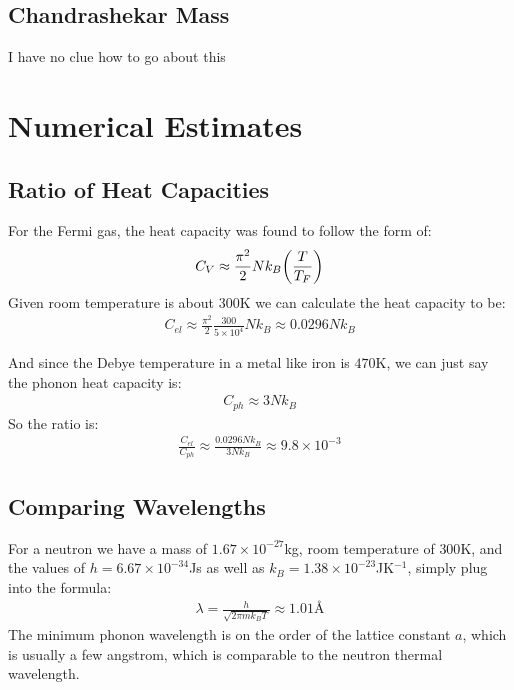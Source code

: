 \documentclass[12pt]{article}
\begin{document}
\subsection{Chandrashekar Mass}
I have no clue how to go about this

\section{Numerical Estimates}
\subsection{Ratio of Heat Capacities}
For the Fermi gas, the heat capacity was found to follow the form of:
\begin{align*}
  C_V\approx\frac{\pi^2}{2}Nk_B\qty(\frac{T}{T_F})
\end{align*}
Given room temperature is about $300$K we can calculate the heat capacity to be:
\begin{align*}
  C_{el}\approx\frac{\pi^2}2\frac{300}{5\times10^4}Nk_B\approx0.0296Nk_B
\end{align*}

And since the Debye temperature in a metal like iron is $470$K, we can just say the phonon heat capacity is:
\begin{align*}
  C_{ph}\approx 3Nk_B
\end{align*}
So the ratio is:
\begin{align}
  \boxed{
    \frac{C_{el}}{C_{ph}}\approx\frac{0.0296Nk_B}{3Nk_B}\approx 9.8\times10^{-3}
  }
\end{align}

\subsection{Comparing Wavelengths}
For a neutron we have a mass of $1.67\times10^{-27}$kg, room temperature of $300$K, and the values of $h=6.67\times10^{-34}$Js as well as $k_B=1.38\times10^{-23}$JK$^{-1}$, simply plug into the formula:
\begin{align}
  \boxed{\lambda=\frac{h}{\sqrt{2\pi mk_BT}}\approx1.01\text{\AA}}
\end{align}
The minimum phonon wavelength is on the order of the lattice constant $a$, which is usually a few angstrom, which is comparable to the neutron thermal wavelength.
\end{document}
